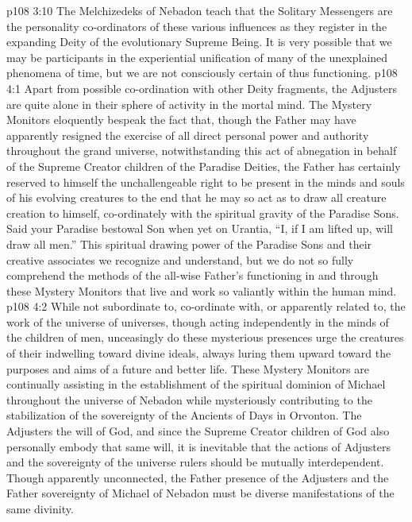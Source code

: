 \vs p108 3:10 The Melchizedeks of Nebadon teach that the Solitary Messengers are the personality co\hyp{}ordinators of these various influences as they register in the expanding Deity of the evolutionary Supreme Being. It is very possible that we may be participants in the experiential unification of many of the unexplained phenomena of time, but we are not consciously certain of thus functioning.
\vs p108 4:1 Apart from possible co\hyp{}ordination with other Deity fragments, the Adjusters are quite alone in their sphere of activity in the mortal mind. The Mystery Monitors eloquently bespeak the fact that, though the Father may have apparently resigned the exercise of all direct personal power and authority throughout the grand universe, notwithstanding this act of abnegation in behalf of the Supreme Creator children of the Paradise Deities, the Father has certainly reserved to himself the unchallengeable right to be present in the minds and souls of his evolving creatures to the end that he may so act as to draw all creature creation to himself, co\hyp{}ordinately with the spiritual gravity of the Paradise Sons. Said your Paradise bestowal Son when yet on Urantia, “I, if I am lifted up, will draw all men.” This spiritual drawing power of the Paradise Sons and their creative associates we recognize and understand, but we do not so fully comprehend the methods of the all\hyp{}wise Father’s functioning in and through these Mystery Monitors that live and work so valiantly within the human mind.
\vs p108 4:2 While not subordinate to, co\hyp{}ordinate with, or apparently related to, the work of the universe of universes, though acting independently in the minds of the children of men, unceasingly do these mysterious presences urge the creatures of their indwelling toward divine ideals, always luring them upward toward the purposes and aims of a future and better life. These Mystery Monitors are continually assisting in the establishment of the spiritual dominion of Michael throughout the universe of Nebadon while mysteriously contributing to the stabilization of the sovereignty of the Ancients of Days in Orvonton. The Adjusters  the will of God, and since the Supreme Creator children of God also personally embody that same will, it is inevitable that the actions of Adjusters and the sovereignty of the universe rulers should be mutually interdependent. Though apparently unconnected, the Father presence of the Adjusters and the Father sovereignty of Michael of Nebadon must be diverse manifestations of the same divinity.
